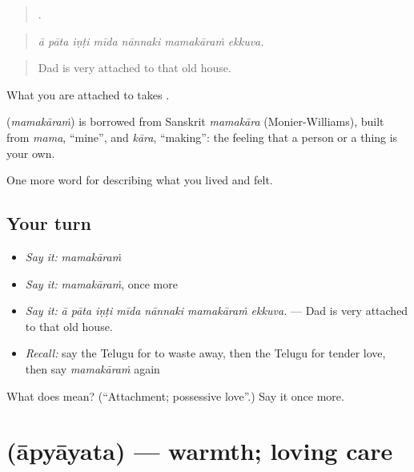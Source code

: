 \begin{quote}
      .
\end{quote}

\begin{quote}
\emph{ā pāta iṇṭi mīda nānnaki mamakāraṁ ekkuva.}
\end{quote}

\begin{quote}
Dad is very attached to that old house.
\end{quote}

What you are attached to takes .

\begin{cousinweb}
\textbf{} (\emph{mamakāraṁ}) is borrowed from Sanskrit \emph{mamakāra} (Monier-Williams), built from \emph{mama}, \textquotedblleft{}mine\textquotedblright{}, and \emph{kāra}, \textquotedblleft{}making\textquotedblright{}: the feeling that a person or a thing is your own.
\end{cousinweb}

\begin{grammarlens}[title={What you've built}]
One more word for describing what you lived and felt.
\end{grammarlens}

\subsection*{Your turn}
\begin{itemize}
\raggedright
  \item \emph{Say it:} \emph{mamakāraṁ}
  \item \emph{Say it:} \emph{mamakāraṁ}, once more
  \item \emph{Say it:} \emph{ā pāta iṇṭi mīda nānnaki mamakāraṁ ekkuva.} — Dad is very attached to that old house.
  \item \emph{Recall:} say the Telugu for to waste away, then the Telugu for tender love, then say \emph{mamakāraṁ} again
\end{itemize}

\begin{tcolorbox}[breakable,colback=teal!4,colframe=teal!35!black,title={Before you move on}]
What does  mean? (\textquotedblleft{}Attachment; possessive love\textquotedblright{}.) Say it once more.
\end{tcolorbox}
\section[\texorpdfstring{\te{ఆప్యాయత} (āpyāyata)}{ఆప్యాయత (āpyāyata)}]{ (āpyāyata) — warmth; loving care}

